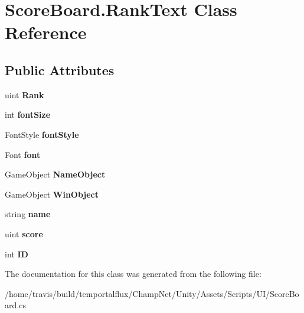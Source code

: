 \hypertarget{class_score_board_1_1_rank_text}{\section{Score\-Board.\-Rank\-Text Class Reference}
\label{class_score_board_1_1_rank_text}
}
\subsection*{Public Attributes}
\begin{DoxyCompactItemize}
\item 
\hypertarget{class_score_board_1_1_rank_text_a60c0f6491627f609f13ea33ae6cee000}{uint {\bfseries Rank}}\label{class_score_board_1_1_rank_text_a60c0f6491627f609f13ea33ae6cee000}

\item 
\hypertarget{class_score_board_1_1_rank_text_a7cd14f47e2a22acedbecf27fd100f8fd}{int {\bfseries font\-Size}}\label{class_score_board_1_1_rank_text_a7cd14f47e2a22acedbecf27fd100f8fd}

\item 
\hypertarget{class_score_board_1_1_rank_text_a7fe435f4d04ade5af1b00d67a523cfdf}{Font\-Style {\bfseries font\-Style}}\label{class_score_board_1_1_rank_text_a7fe435f4d04ade5af1b00d67a523cfdf}

\item 
\hypertarget{class_score_board_1_1_rank_text_adbf90323214eddb0b4d7fc5287ad7549}{Font {\bfseries font}}\label{class_score_board_1_1_rank_text_adbf90323214eddb0b4d7fc5287ad7549}

\item 
\hypertarget{class_score_board_1_1_rank_text_ae8f670f701a8007114c80981c4bf3ce7}{Game\-Object {\bfseries Name\-Object}}\label{class_score_board_1_1_rank_text_ae8f670f701a8007114c80981c4bf3ce7}

\item 
\hypertarget{class_score_board_1_1_rank_text_a558c65dcc4b67d850be54e47dc91fff0}{Game\-Object {\bfseries Win\-Object}}\label{class_score_board_1_1_rank_text_a558c65dcc4b67d850be54e47dc91fff0}

\item 
\hypertarget{class_score_board_1_1_rank_text_a6f7701cb446d574c4a5ea7cec611ba2b}{string {\bfseries name}}\label{class_score_board_1_1_rank_text_a6f7701cb446d574c4a5ea7cec611ba2b}

\item 
\hypertarget{class_score_board_1_1_rank_text_a13ad6b821540d3fce3650a4590dabfc5}{uint {\bfseries score}}\label{class_score_board_1_1_rank_text_a13ad6b821540d3fce3650a4590dabfc5}

\item 
\hypertarget{class_score_board_1_1_rank_text_a370ca923374efc2137c9d54c38f7901e}{int {\bfseries I\-D}}\label{class_score_board_1_1_rank_text_a370ca923374efc2137c9d54c38f7901e}

\end{DoxyCompactItemize}


The documentation for this class was generated from the following file\-:\begin{DoxyCompactItemize}
\item 
/home/travis/build/temportalflux/\-Champ\-Net/\-Unity/\-Assets/\-Scripts/\-U\-I/Score\-Board.\-cs\end{DoxyCompactItemize}
